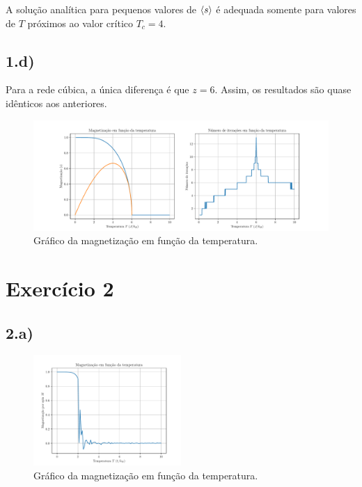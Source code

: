 \documentclass[a4paper, brazil]{article}
\begin{document}
    A solução analítica para pequenos valores de \( \expval{s} \) é adequada somente para valores de \( T \) próximos ao valor crítico \( T_c = 4 \).

\newpage
\subsection*{1.d)}

    Para a rede cúbica, a única diferença é que \( z = 6 \).
    Assim, os resultados são quase idênticos aos anteriores.
    \begin{figure}[ht]
        \centering
        \includegraphics[width=\textwidth]{fig_1d.pdf}
        \caption{Gráfico da magnetização em função da temperatura.}\label{fig1d}
    \end{figure}

\newpage
\section{Exercício 2}

\subsection*{2.a)}

    \begin{figure}[ht]
        \centering
        \includegraphics[width=0.5\textwidth]{fig_2a.pdf}
        \caption{Gráfico da magnetização em função da temperatura.}\label{fig2a}
    \end{figure}
\end{document}
